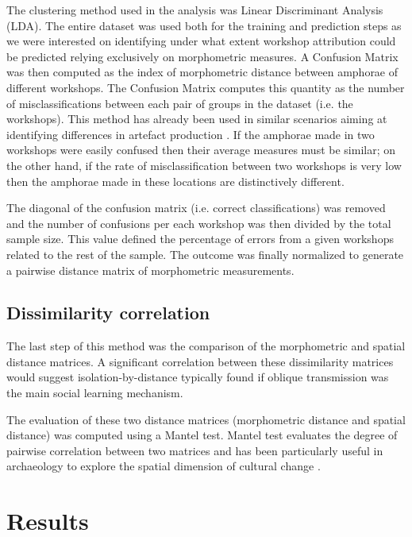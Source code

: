 \documentclass[review]{elsarticle}
\begin{document}
The clustering method used in the analysis was Linear Discriminant Analysis (LDA). The entire dataset was used both for the training and prediction steps as we were interested on identifying under what extent workshop attribution could be predicted relying exclusively on morphometric measures. A Confusion Matrix was then computed as the index of morphometric distance between amphorae of different workshops. The Confusion Matrix computes this quantity as the number of misclassifications between each pair of groups in the dataset (i.e. the workshops). This method has already been used in similar scenarios aiming at identifying differences in artefact production \citep{thorpe_distribution_1984,i_martin_alisis_1998,charlton_investigating_2012}. If the amphorae made in two workshops were easily confused then their average measures must be similar; on the other hand, if the rate of misclassification between two workshops is very low then the amphorae made in these locations are distinctively different.

The diagonal of the confusion matrix (i.e. correct classifications) was removed and the number of confusions per each workshop was then divided by the total sample size. This value defined the percentage of errors from a given workshops related to the rest of the sample. The outcome was finally normalized to generate a pairwise distance matrix of morphometric measurements.

\subsection{Dissimilarity correlation}

The last step of this method was the comparison of the morphometric and spatial distance matrices. A significant correlation between these dissimilarity matrices would suggest isolation-by-distance typically found if oblique transmission was the main social learning mechanism.

The evaluation of these two distance matrices (morphometric distance and spatial distance) was computed using a Mantel test. Mantel test evaluates the degree of pairwise correlation between two matrices and has been particularly useful in archaeology to explore the spatial dimension of cultural change \citep{mantel_detection_1967, diniz-filho_mantel_2013, crema_culture_2014}.  

\section{Results}
\end{document}
